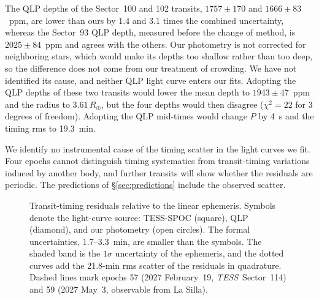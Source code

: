 \documentclass[twocolumn,linenumbers]{aastex701}
\newcommand{\tess}{\textit{TESS}}
\newcommand{\rearth}{R_\oplus}
\begin{document}
The QLP depths of the Sector~100 and 102 transits, $1757 \pm 170$ and $1666 \pm 83$~ppm, are lower than ours by 1.4 and 3.1 times the combined uncertainty, whereas the Sector~93 QLP depth, measured before the change of method, is $2025 \pm 84$~ppm and agrees with the others. Our photometry is not corrected for neighboring stars, which would make its depths too shallow rather than too deep, so the difference does not come from our treatment of crowding. We have not identified its cause, and neither QLP light curve enters our fits. Adopting the QLP depths of these two transits would lower the mean depth to $1943 \pm 47$~ppm and the radius to $3.61\,\rearth$, but the four depths would then disagree ($\chi^2 = 22$ for 3 degrees of freedom). Adopting the QLP mid-times would change $P$ by 4~s and the timing rms to 19.3~min.

We identify no instrumental cause of the timing scatter in the light curves we fit. Four epochs cannot distinguish timing systematics from transit-timing variations induced by another body, and further transits will show whether the residuals are periodic. The predictions of \S\ref{sec:predictions} include the observed scatter.

\begin{figure}
\caption{Transit-timing residuals relative to the linear ephemeris. Symbols denote the light-curve source: TESS-SPOC (square), QLP (diamond), and our photometry (open circles). The formal uncertainties, 1.7--3.3~min, are smaller than the symbols. The shaded band is the $1\sigma$ uncertainty of the ephemeris, and the dotted curves add the 21.8-min rms scatter of the residuals in quadrature. Dashed lines mark epochs 57 (2027 February~19, \tess\ Sector~114) and 59 (2027 May~3, observable from La Silla).\label{fig:oc}}
\end{figure}
\end{document}
